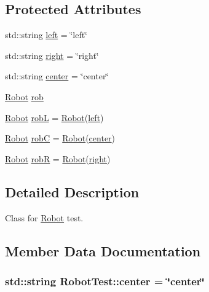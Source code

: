 \subsection*{Protected Attributes}
\begin{DoxyCompactItemize}
\item 
std\+::string \hyperlink{class_robot_test_ada4ffa3a6eef822a8f5d3c96504decfc}{left} = \char`\"{}left\char`\"{}
\item 
std\+::string \hyperlink{class_robot_test_a95148cd39b86db94058ad7cbd5f4baeb}{right} = \char`\"{}right\char`\"{}
\item 
std\+::string \hyperlink{class_robot_test_a494b9d59a95a0433635069b95f382277}{center} = \char`\"{}center\char`\"{}
\item 
\hyperlink{class_robot}{Robot} \hyperlink{class_robot_test_a2435a71972449d754c6db3bfbe16eb33}{rob}
\item 
\hyperlink{class_robot}{Robot} \hyperlink{class_robot_test_af05d7dded07482862a76de2dde034686}{robL} = \hyperlink{class_robot}{Robot}(\hyperlink{class_robot_test_ada4ffa3a6eef822a8f5d3c96504decfc}{left})
\item 
\hyperlink{class_robot}{Robot} \hyperlink{class_robot_test_a4a293ed153d39518e636bd67839425e3}{robC} = \hyperlink{class_robot}{Robot}(\hyperlink{class_robot_test_a494b9d59a95a0433635069b95f382277}{center})
\item 
\hyperlink{class_robot}{Robot} \hyperlink{class_robot_test_aed2ebf652db21d16a87b9fee909654b9}{robR} = \hyperlink{class_robot}{Robot}(\hyperlink{class_robot_test_a95148cd39b86db94058ad7cbd5f4baeb}{right})
\end{DoxyCompactItemize}


\subsection{Detailed Description}
Class for \hyperlink{class_robot}{Robot} test. 

\subsection{Member Data Documentation}
\subsubsection[{\texorpdfstring{center}{center}}]{\setlength{\rightskip}{0pt plus 5cm}std\+::string Robot\+Test\+::center = \char`\"{}center\char`\"{}\hspace{0.3cm}{\ttfamily [protected]}}\hypertarget{class_robot_test_a494b9d59a95a0433635069b95f382277}{}\label{class_robot_test_a494b9d59a95a0433635069b95f382277}
